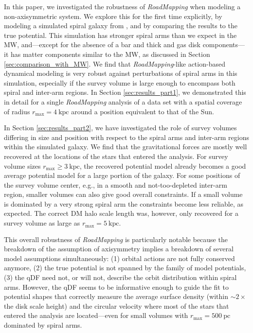 \documentclass[iop,revtex4,numberedappendix,appendixfloats]{emulateapj}
\newcommand{\RM}{{\sl RoadMapping}}
\begin{document}
In this paper, we investigated the robustness of \RM{} when modeling a non-axisymmetric system. We explore this for the first time explicitly, by modeling a simulated spiral galaxy from \citet{2013ApJ...766...34D}, and by comparing the results to the true potential. This simulation has stronger spiral arms than we expect in the MW, and---except for the absence of a bar and thick and gas disk components---it has matter components similar to the MW, as discussed in Section \ref{sec:comparison_with_MW}. We find that \RM{}-like action-based dynamical modeling is very robust against perturbations of spiral arms in this simulation, especially if the survey volume is large enough to encompass both spiral and inter-arm regions. In Section \ref{sec:results_part1}, we demonstrated this in detail for a single \RM{} analysis of a data set with a spatial coverage of radius $r_\text{max}=4~\text{kpc}$ around a position equivalent to that of the Sun.

In Section \ref{sec:results_part2}, we have investigated the role of survey volumes differing in size and position with respect to the spiral arms and inter-arm regions within the simulated galaxy. We find that the gravitational forces are mostly well recovered at the locations of the stars that entered the analysis. For survey volume sizes $r_\text{max} \geq 3~\text{kpc}$, the recovered potential model already becomes a good average potential model for a large portion of the galaxy. For some positions of the survey volume center, e.g., in a smooth and not-too-depleted inter-arm region, smaller volumes can also give good overall constraints. If a small volume is dominated by a very strong spiral arm the constraints become less reliable, as expected. The correct DM halo scale length was, however, only recovered for a survey volume as large as $r_\text{max}=5~\text{kpc}$. 

This overall robustness of \RM{} is particularly notable because the breakdown of the assumption of axisymmetry implies a breakdown of several model assumptions simultaneously: (1) orbital actions are not fully conserved anymore, (2) the true potential is not spanned by the family of model potentials, (3) the qDF need not, or will not, describe the orbit distribution within spiral arms. However, the qDF seems to be informative enough to guide the fit to potential shapes that correctly measure the average surface density (within $\sim2 \times$ the disk scale height) and the circular velocity where most of the stars that entered the analysis are located---even for small volumes with $r_\text{max}=500~\text{pc}$ dominated by spiral arms. 
\end{document}
